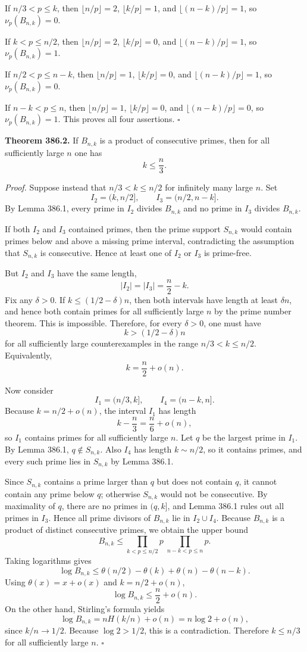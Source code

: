 If $n/3<p\leq k$, then $\lfloor n/p\rfloor=2$, $\lfloor k/p\rfloor=1$, and $\lfloor (n-k)/p\rfloor=1$, so $\nu_p(B_{n,k})=0$.

If $k<p\leq n/2$, then $\lfloor n/p\rfloor=2$, $\lfloor k/p\rfloor=0$, and $\lfloor (n-k)/p\rfloor=1$, so $\nu_p(B_{n,k})=1$.

If $n/2<p\leq n-k$, then $\lfloor n/p\rfloor=1$, $\lfloor k/p\rfloor=0$, and $\lfloor (n-k)/p\rfloor=1$, so $\nu_p(B_{n,k})=0$.

If $n-k<p\leq n$, then $\lfloor n/p\rfloor=1$, $\lfloor k/p\rfloor=0$, and $\lfloor (n-k)/p\rfloor=0$, so $\nu_p(B_{n,k})=1$.
This proves all four assertions. \hfill $\square$

\medskip

\textbf{Theorem 386.2.} If $B_{n,k}$ is a product of consecutive primes, then for all sufficiently large $n$ one has
\[
k\leq \frac n3.
\]

\emph{Proof.} Suppose instead that $n/3<k\leq n/2$ for infinitely many large $n$.
Set
\[
I_2=(k,n/2],\qquad I_3=(n/2,n-k].
\]
By Lemma 386.1, every prime in $I_2$ divides $B_{n,k}$ and no prime in $I_3$ divides $B_{n,k}$.

If both $I_2$ and $I_3$ contained primes, then the prime support $S_{n,k}$ would contain primes below and above a missing prime interval, contradicting the assumption that $S_{n,k}$ is consecutive. Hence at least one of $I_2$ or $I_3$ is prime-free.

But $I_2$ and $I_3$ have the same length,
\[
|I_2|=|I_3|=\frac n2-k.
\]
Fix any $\delta>0$. If $k\leq (1/2-\delta)n$, then both intervals have length at least $\delta n$, and hence both contain primes for all sufficiently large $n$ by the prime number theorem. This is impossible. Therefore, for every $\delta>0$, one must have
\[
k>(1/2-\delta)n
\]
for all sufficiently large counterexamples in the range $n/3<k\leq n/2$. Equivalently,
\[
k=\frac n2+o(n).
\]

Now consider
\[
I_1=(n/3,k],\qquad I_4=(n-k,n].
\]
Because $k=n/2+o(n)$, the interval $I_1$ has length
\[
k-\frac n3=\frac n6+o(n),
\]
so $I_1$ contains primes for all sufficiently large $n$. Let $q$ be the largest prime in $I_1$. By Lemma 386.1, $q\notin S_{n,k}$.
Also $I_4$ has length $k\sim n/2$, so it contains primes, and every such prime lies in $S_{n,k}$ by Lemma 386.1.

Since $S_{n,k}$ contains a prime larger than $q$ but does not contain $q$, it cannot contain any prime below $q$; otherwise $S_{n,k}$ would not be consecutive. By maximality of $q$, there are no primes in $(q,k]$, and Lemma 386.1 rules out all primes in $I_3$. Hence all prime divisors of $B_{n,k}$ lie in $I_2\cup I_4$.
Because $B_{n,k}$ is a product of distinct consecutive primes, we obtain the upper bound
\[
B_{n,k}
\leq
\prod_{k<p\leq n/2} p\; \prod_{n-k<p\leq n} p.
\]
Taking logarithms gives
\[
\log B_{n,k}
\leq
\theta(n/2)-\theta(k)+\theta(n)-\theta(n-k).
\]
Using $\theta(x)=x+o(x)$ and $k=n/2+o(n)$,
\[
\log B_{n,k}\leq \frac n2+o(n).
\]
On the other hand, Stirling's formula yields
\[
\log B_{n,k}=nH(k/n)+o(n)=n\log 2+o(n),
\]
since $k/n\to 1/2$. Because $\log 2>1/2$, this is a contradiction.
Therefore $k\leq n/3$ for all sufficiently large $n$. \hfill $\square$

